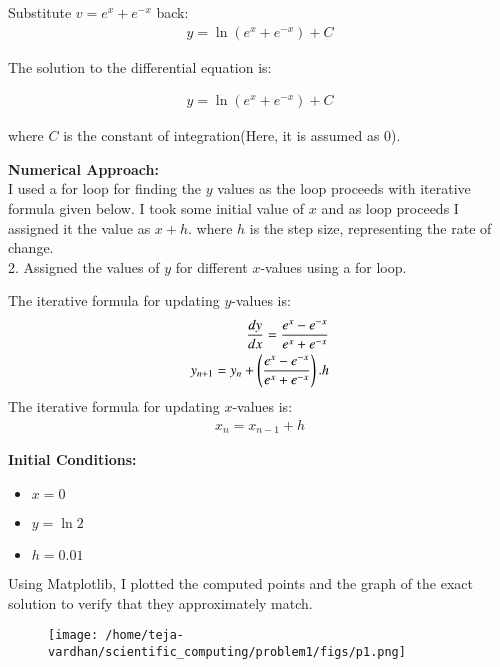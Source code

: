 \documentclass[article]{IEEEtran}
\numberwithin{figure}{enumi}
\begin{document}
\noindent Substitute $v = e^x + e^{-x}$ back:
\begin{align}
   y = \ln(e^x + e^{-x}) + C
\end{align}

\noindent The solution to the differential equation is:

\begin{align}
  \boxed{y = \ln(e^x + e^{-x}) + C}
\end{align}



where $C$ is the constant of integration(Here, it is assumed as 0).

\vspace{0.5em}

\noindent\textbf{Numerical Approach:}\\ I used a for loop for finding the $y$ values as the loop proceeds with iterative formula given below. I took some initial value of $x$ and as loop proceeds I assigned it the value as $x+h$. where $h$ is the step size, representing the rate of change. 
\\2. Assigned the values of $y$ for different $x$-values using a for loop.  

\noindent The iterative formula for updating $y$-values is:  
\begin{align}
    \frac{dy}{dx}=\frac{e^x - e^{-x}}{e^x + e^{-x}}\\
    y_{n+1}=y_n+\left(\frac{e^x - e^{-x}}{e^x + e^{-x}}\right).h
\end{align}
The iterative formula for updating $x$-values is: 
\begin{align}
    x_n=x_{n-1}+h
\end{align} 

\noindent\textbf{Initial Conditions:}  
\begin{itemize}
    \item $x = 0$  
    \item $y = \ln2$  
    \item $h = 0.01$  
\end{itemize}

Using Matplotlib, I plotted the computed points and the graph of the exact solution to verify that they approximately match.
\begin{figure}[h!]
	\centering
	\texttt{[image: /home/teja-vardhan/scientific\_computing/problem1/figs/p1.png]}
	\label{stemplot}
\end{figure}	
\end{document}
